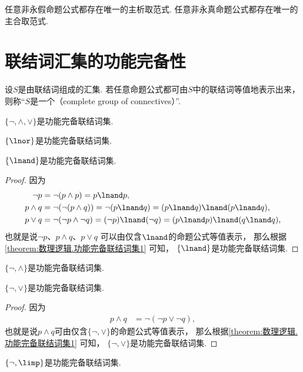\begin{theorem}
任意非永假命题公式都存在唯一的主析取范式.
任意非永真命题公式都存在唯一的主合取范式.
\end{theorem}

\section{联结词汇集的功能完备性}
\begin{definition}
设\(S\)是由联结词组成的汇集.
若任意命题公式都可由\(S\)中的联结词等值地表示出来，
则称“\(S\)是一个（complete group of connectives）”.
\end{definition}

\begin{theorem}\label{theorem:数理逻辑.功能完备联结词集1}
\(\{\neg,\land,\lor\}\)是功能完备联结词集.
\end{theorem}
\begin{corollary}
\(\{\lnor\}\)是功能完备联结词集.
\end{corollary}
\begin{corollary}
\(\{\lnand\}\)是功能完备联结词集.
\begin{proof}
因为\begin{align*}
	\neg p
	&= \neg(p \land p)
	= p \lnand p, \\
	p \land q
	&= \neg(\neg(p \land q))
	= \neg(p \lnand q)
	= (p \lnand q) \lnand (p \lnand q), \\
	p \lor q
	&= \neg(\neg p \land \neg q)
	= (\neg p) \lnand (\neg q)
	= (p \lnand p) \lnand (q \lnand q),
\end{align*}
也就是说\(\neg p\)、\(p \land q\)、\(p \lor q\)
可以由仅含\(\lnand\)的命题公式等值表示，
那么根据\cref{theorem:数理逻辑.功能完备联结词集1} 可知，
\(\{\lnand\}\)是功能完备联结词集.
\end{proof}
\end{corollary}
\begin{corollary}
\(\{\neg,\land\}\)是功能完备联结词集.
\end{corollary}
\begin{corollary}\label{theorem:数理逻辑.功能完备联结词集5}
\(\{\neg,\lor\}\)是功能完备联结词集.
\begin{proof}
因为\begin{align*}
	p \land q
	&= \neg(\neg p \lor \neg q),
\end{align*}
也就是说\(p \land q\)可由仅含\(\{\neg,\lor\}\)的命题公式等值表示，
那么根据\cref{theorem:数理逻辑.功能完备联结词集1} 可知，
\(\{\neg,\lor\}\)是功能完备联结词集.
\end{proof}
\end{corollary}
\begin{corollary}
\(\{\neg,\limp\}\)是功能完备联结词集.
\end{corollary}

